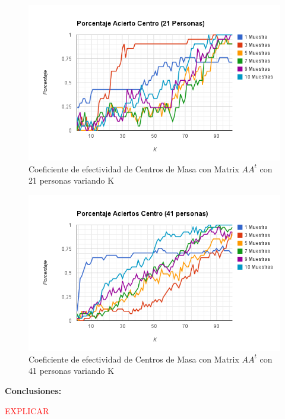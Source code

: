 \begin{figure}[H]
\includegraphics[width=1\textwidth]{img/imagef14.png}
     \caption{Coeficiente de efectividad de Centros de Masa con Matrix $AA^t$ con 21 personas variando K}
\end{figure}

\begin{figure}[H]
\includegraphics[width=1\textwidth]{img/imagef15.png}
     \caption{Coeficiente de efectividad de Centros de Masa  con Matrix $AA^t$ con 41 personas variando K}
\end{figure}


\textbf{Conclusiones:}

\textcolor{red}{EXPLICAR}
